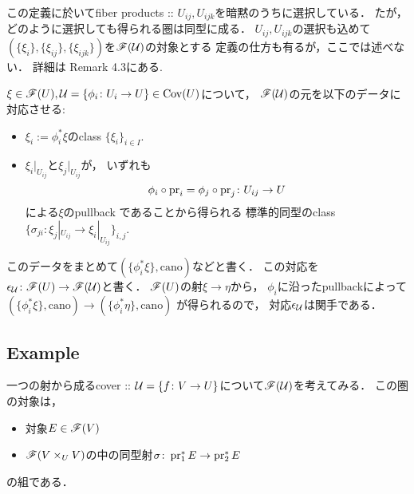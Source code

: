 \documentclass[a4paper]{jsarticle}
\begin{document}
\begin{Remark}
    この定義に於いてfiber products :: $U_{ij}, U_{ijk}$を暗黙のうちに選択している．
    たが，どのように選択しても得られる圏は同型に成る．
    $U_{ij}, U_{ijk}$の選択も込めて
    $(\{\xi_i\}, \{\xi_{ij}\}, \{\xi_{ijk}\})$を$\mathscr{F}(\mathcal{U})$の対象とする
    定義の仕方も有るが，ここでは述べない．
    詳細は\cite{NoteGroTop} Remark 4.3にある.
\end{Remark}

\begin{Def} \label{def:epsilon}
    $\xi \in \mathscr{F}(U), \mathcal{U}=\{\phi_i \colon U_i \to U\} \in \operatorname{Cov}(U)$について，
    $\mathscr{F}(\mathcal{U})$の元を以下のデータに対応させる:
    \begin{itemize}
        \item $\xi_i:=\phi_i^*\xi$のclass $\{\xi_i\}_{i \in I}$.
        \item
            $\xi_i|_{U_{ij}}$と$\xi_j|_{U_{ij}}$が，
            いずれも
            \[ \phi_i \circ \operatorname{pr}_i=\phi_j \circ \operatorname{pr}_j \colon U_{ij} \to U \]による$\xi$のpullback
            であることから得られる
            標準的同型のclass $\{ \sigma_{ji} \colon \xi_j|_{U_{ij}} \to \xi_i|_{U_{ij}} \}_{i,j}$.
    \end{itemize}
    このデータをまとめて$(\{\phi_i^*\xi\}, \mathrm{cano})$などと書く．
    この対応を$\epsilon_{\mathcal{U}} \colon \mathscr{F}(U) \to \mathscr{F}(\mathcal{U})$と書く．
    $\mathscr{F}(U)$の射$\xi \to \eta$から，
    $\phi_i$に沿ったpullbackによって$(\{\phi_i^*\xi\}, \mathrm{cano}) \to (\{\phi_i^*\eta\}, \mathrm{cano})$
    が得られるので，
    対応$\epsilon_{\mathcal{U}}$は関手である．
\end{Def}

\subsection{Example}
\begin{Example}
    一つの射から成るcover :: $\mathcal{U}=\{f \colon V \to U\}$について$\mathscr{F}(\mathcal{U})$を考えてみる．
    この圏の対象は，
    \begin{itemize}
        \item 対象$E \in \mathscr{F}(V)$
        \item $\mathscr{F}(V \times_U V)$の中の同型射$\sigma \colon \operatorname{pr}_1^*E \to \operatorname{pr}_2^*E$
    \end{itemize}
    の組である．
\end{Example}



\end{document}
